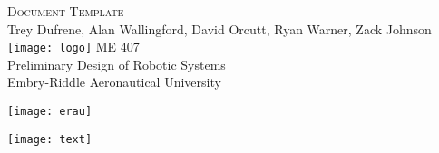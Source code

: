 \begin{titlepage}
\flushleft
\doublespacing
\Large
\textsc{Document Template} \\
\normalsize
Trey Dufrene, Alan Wallingford, David Orcutt, Ryan Warner, Zack Johnson
\vfill
\center
\texttt{[image: logo]}
\vfill
\flushleft
ME 407 \\
Preliminary Design of Robotic Systems \\
Embry-Riddle Aeronautical University \\
\vspace{2ex}
\begin{minipage}[c]{.5\textwidth}
\flushleft
\texttt{[image: erau]}
\end{minipage}%
\begin{minipage}[c]{.5\textwidth}
\flushright
\texttt{[image: text]}
\end{minipage}
\end{titlepage}
